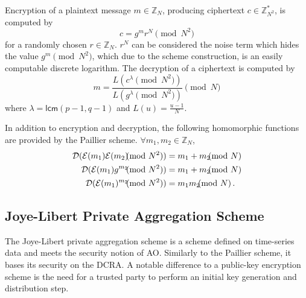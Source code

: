 \documentclass[twocolumn]{autart}
\begin{document}
Encryption of a plaintext message $m \in \mathbb{Z}_N$, producing ciphertext $c \in \mathbb{Z}^{*}_{N^2}$, is computed by
\begin{equation}
    c = g^m r^N \pmod{N^2}
\end{equation}
for a randomly chosen $r \in \mathbb{Z}_{N}$. $r^N$ can be considered the noise term which hides the value $g^m \pmod{N^2}$, which due to the scheme construction, is an easily computable discrete logarithm. The decryption of a ciphertext is computed by
\begin{equation}
    m = \frac{L(c^\lambda\pmod{N^2})}{L(g^\lambda\pmod{N^2})} \pmod{N}
\end{equation}
where $\lambda = \mathsf{lcm}(p-1, q-1)$ and $L(u) = \frac{u-1}{N}$.

In addition to encryption and decryption, the following homomorphic functions are provided by the Paillier scheme. $\forall m_1,m_2 \in \mathbb{Z}_N$,
\begin{align}
    \mathcal{D}(\mathcal{E}(m_1)\mathcal{E}(m_2) \hspace{-7pt} \pmod{N^2}) &= m_1+m_2 \hspace{-7pt} \pmod{N} \\
    \mathcal{D}(\mathcal{E}(m_1)g^{m_2} \hspace{-7pt} \pmod{N^2}) &= m_1+m_2\hspace{-7pt}\pmod{N} \\
    \mathcal{D}(\mathcal{E}(m_1)^{m_2} \hspace{-7pt} \pmod{N^2}) &= m_1m_2 \hspace{-7pt} \pmod{N}\,. \label{eqn:paillier_hom_mult}
\end{align}

% 
% 

\subsection{Joye-Libert Private Aggregation Scheme} \label{subsec:joye_libert_scheme}
The Joye-Libert private aggregation scheme \cite{joyeScalableSchemePrivacyPreserving2013} is a scheme defined on time-series data and meets the security notion of AO. Similarly to the Paillier scheme, it bases its security on the DCRA. A notable difference to a public-key encryption scheme is the need for a trusted party to perform an initial key generation and distribution step.
\end{document}
